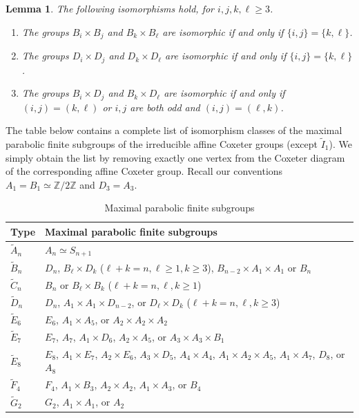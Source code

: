 \documentclass[a4paper, 11pt]{amsart}
\newtheorem{lemme}[te]{Lemma}
\theoremstyle{definition}
\theoremstyle{remark}
\renewcommand{\geq}{\geqslant}
\begin{document}
\begin{lemme}\label{prelim_exception}The following isomorphisms hold, for $i,j,k,\ell \geq 3$.
\begin{enumerate}
    \item The groups $B_i\times B_j$ and $B_k\times B_{\ell}$ are isomorphic if and only if $\lbrace i,j\rbrace=\lbrace k,\ell\rbrace$.
    \item The groups $D_i\times D_j$ and $D_k\times D_{\ell}$ are isomorphic if and only if $\lbrace i,j\rbrace=\lbrace k,\ell\rbrace$.
    \item The groups $B_i\times D_j$ and $B_k\times D_{\ell}$ are isomorphic if and only if $(i,j)=(k,\ell)$ or $i,j$ are both odd and $(i,j)=(\ell,k)$.
\end{enumerate}
\end{lemme}

The table below contains a complete list of isomorphism classes of the maximal parabolic finite subgroups of the irreducible affine Coxeter groups (except $\tilde{I}_1$). We simply obtain the list by removing exactly one vertex from the Coxeter diagram of the corresponding affine Coxeter group. Recall our conventions $A_1=B_1\simeq \mathbb{Z}/2\mathbb{Z}$ and $D_3=A_3$.

\begin{table}[h]
    \centering
    \renewcommand{\arraystretch}{1.5}
    \begin{tabular}{|l|l|}
        \hline
        \textbf{Type} & \textbf{Maximal parabolic finite subgroups} \\ \hline
        $\tilde{A}_n$ & $A_n \simeq S_{n+1}$ \\ \hline
        $\tilde{B}_n$ & $D_n$, $B_{\ell} \times D_k$ ($\ell+k=n, \ell \geq 1, k \geq 3$), $B_{n-2}\times A_1\times A_1$ or $B_n$ \\ \hline
        $\tilde{C}_n$ & $B_n$ or $B_{\ell} \times B_k$ ($\ell+k=n, \ell,k \geq 1$) \\ \hline
        $\tilde{D}_n$ & $D_n$, $A_1 \times A_1 \times D_{n-2}$, or $D_{\ell} \times D_k$ ($\ell+k=n, \ell,k \geq 3$) \\ \hline
        $\tilde{E}_6$ & $E_6$, $A_1 \times A_5$, or $A_2 \times A_2 \times A_2$ \\ \hline
        $\tilde{E}_7$ & $E_7$, $A_7$, $A_1 \times D_6$, $A_2 \times A_5$, or $A_3 \times A_3 \times B_1$ \\ \hline
        $\tilde{E}_8$ & $E_8$, $A_1 \times E_7$, $A_2 \times E_6$, $A_3 \times D_5$, $A_4 \times A_4$, $A_1 \times A_2 \times A_5$, $A_1 \times A_7$, $D_8$, or $A_8$ \\ \hline
        $\tilde{F}_4$ & $F_4$, $A_1 \times B_3$, $A_2 \times A_2$, $A_1 \times A_3$, or $B_4$ \\ \hline
        $\tilde{G}_2$ & $G_2$, $A_1 \times A_1$, or $A_2$ \\ \hline
    \end{tabular}
    \caption{Maximal parabolic finite subgroups}
    \label{tab:subgroup_classification}
\end{table}
\end{document}

